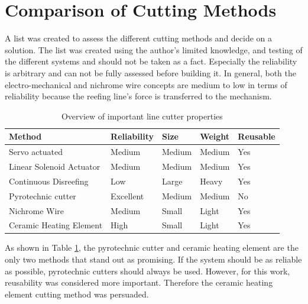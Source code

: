 \section{Comparison of Cutting Methods}
A list was created to assess the different cutting methods and decide on a solution. The list was created using the author's limited knowledge, and testing of the different systems and should not be taken as a fact. Especially the reliability is arbitrary and can not be fully assessed before building it. In general, both the electro-mechanical and nichrome wire concepts are medium to low in terms of reliability because the reefing line's force is transferred to the mechanism.  
\begin{table}[h]
    \centering
    \begin{tabular}{ | l | p{2cm} | p{2cm} | p{2cm} | p{1.95cm} |}
      \hline
      \textbf{Method}               & \textbf{Reliability}  & \textbf{Size}  & \textbf{Weight}  & \textbf{Reusable}   \\ \hline
      Servo actuated                & Medium                & Medium         & Medium           & Yes                       \\ \hline
      Linear Solenoid Actuator      & Medium                & Medium         & Medium           & Yes                       \\ \hline
      Continuous Disreefing         & Low                   & Large          & Heavy            & Yes                       \\ \hline
      Pyrotechnic cutter            & Excellent             & Medium         & Medium           & No                        \\ \hline
      Nichrome Wire                 & Medium                & Small          & Light            & Yes                       \\ \hline
      Ceramic Heating Element       & High                  & Small          & Light            & Yes                       \\ \hline
    \end{tabular}
    \caption{\label{tab:cutting-methods}Overview of important line cutter properties}
\end{table}

As shown in Table \ref{tab:cutting-methods}, the pyrotechnic cutter and ceramic heating element are the only two methods that stand out as promising. If the system should be as reliable as possible, pyrotechnic cutters should always be used. However, for this work, reusability was considered more important. Therefore the ceramic heating element cutting method was persuaded.